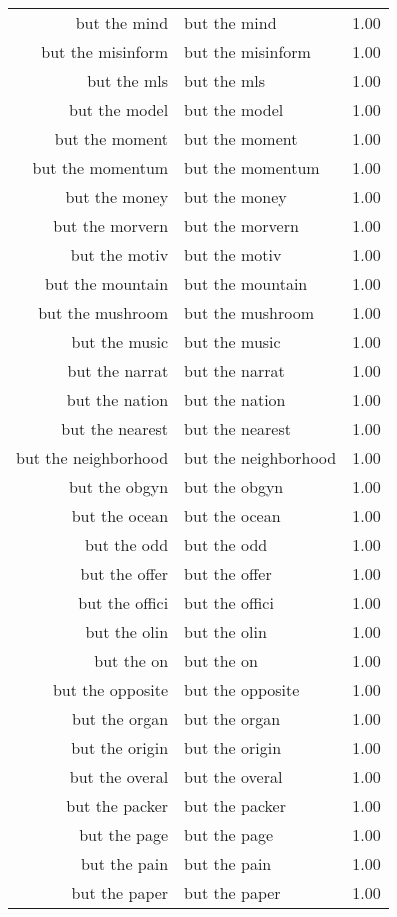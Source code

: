 \begin{table}[ht]
\begin{tabular}{rlr}
  but the mind & but the mind & 1.00 \\ 
  but the misinform & but the misinform & 1.00 \\ 
  but the mls & but the mls & 1.00 \\ 
  but the model & but the model & 1.00 \\ 
  but the moment & but the moment & 1.00 \\ 
  but the momentum & but the momentum & 1.00 \\ 
  but the money & but the money & 1.00 \\ 
  but the morvern & but the morvern & 1.00 \\ 
  but the motiv & but the motiv & 1.00 \\ 
  but the mountain & but the mountain & 1.00 \\ 
  but the mushroom & but the mushroom & 1.00 \\ 
  but the music & but the music & 1.00 \\ 
  but the narrat & but the narrat & 1.00 \\ 
  but the nation & but the nation & 1.00 \\ 
  but the nearest & but the nearest & 1.00 \\ 
  but the neighborhood & but the neighborhood & 1.00 \\ 
  but the obgyn & but the obgyn & 1.00 \\ 
  but the ocean & but the ocean & 1.00 \\ 
  but the odd & but the odd & 1.00 \\ 
  but the offer & but the offer & 1.00 \\ 
  but the offici & but the offici & 1.00 \\ 
  but the olin & but the olin & 1.00 \\ 
  but the on & but the on & 1.00 \\ 
  but the opposite & but the opposite & 1.00 \\ 
  but the organ & but the organ & 1.00 \\ 
  but the origin & but the origin & 1.00 \\ 
  but the overal & but the overal & 1.00 \\ 
  but the packer & but the packer & 1.00 \\ 
  but the page & but the page & 1.00 \\ 
  but the pain & but the pain & 1.00 \\ 
  but the paper & but the paper & 1.00 \\ 

\end{tabular}
\end{table}
